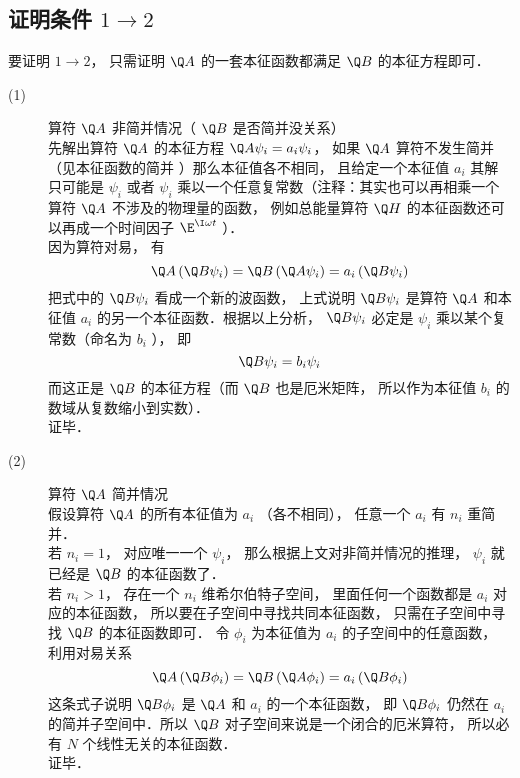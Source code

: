 \subsection{证明条件 $1 \to 2$}
要证明 $1 \to 2$，  只需证明 $\Q A$ 的一套本征函数都满足 $\Q B$ 的本征方程即可．
\begin{description}
  \item[(1)] 算符 $\Q A$ 非简并情况（ $\Q B$ 是否简并没关系）\\
  先解出算符 $\Q A$ 的本征方程 $\Q A{\psi _i} = {a_i}{\psi _i}$，  如果 $\Q A$ 算符不发生简并（见本征函数的简并%
  ）那么本征值各不相同， 且给定一个本征值 $a_i$ 其解只可能是 ${\psi _i}$ 或者 ${\psi _i}$ 乘以一个任意复常数（注释：其实也可以再相乘一个算符 $\Q A$ 不涉及的物理量的函数， 例如总能量算符 $\Q H$ 的本征函数还可以再成一个时间因子 ${\E^{\I\omega t}}$ ）．\\
  因为算符对易， 有
  \begin{equation}
    \Q A\left( {\Q B{\psi _i}} \right) = \Q B\left( {\Q A{\psi _i}} \right) = {a_i}\left( {\Q B{\psi _i}} \right)
  \end{equation}
  把式中的 $\Q B{\psi _i}$ 看成一个新的波函数， 上式说明 $\Q B{\psi _i}$ 是算符 $\Q A$ 和本征值 $a_i$ 的另一个本征函数．根据以上分析，  $\Q B{\psi _i}$ 必定是 ${\psi _i}$ 乘以某个复常数（命名为 $b_i$ ）， 即
  \begin{equation}
    \Q B{\psi _i} = {b_i}{\psi _i}
  \end{equation}
  而这正是 $\Q B$ 的本征方程（而 $\Q B$ 也是厄米矩阵， 所以作为本征值 $b_i$ 的数域从复数缩小到实数）．\\
  证毕．
  \item[(2)] 算符 $\Q A$ 简并情况\\
  假设算符 $\Q A$ 的所有本征值为 $a_i$ （各不相同）， 任意一个 $a_i$ 有 $n_i$ 重简并．\\
若 ${n_i} = 1$，  对应唯一一个 ${\psi _i}$，  那么根据上文对非简并情况的推理， ${\psi _i}$ 就已经是 $\Q B$ 的本征函数了．\\
若 ${n_i} > 1$，  存在一个 $n_i$ 维希尔伯特子空间， 里面任何一个函数都是 $a_i$ 对应的本征函数， 所以要在子空间中寻找共同本征函数， 只需在子空间中寻找 $\Q B$ 的本征函数即可． 令 ${\phi _i}$ 为本征值为 $a_i$ 的子空间中的任意函数， 利用对易关系
\begin{equation}
  \Q A\left( {\Q B{\phi _i}} \right) = \Q B\left( {\Q A{\phi _i}} \right) = {a_i}\left( {\Q B{\phi _i}} \right)
\end{equation}
这条式子说明 $\Q B{\phi _i}$ 是 $\Q A$ 和 $a_i$ 的一个本征函数， 即 $\Q B{\phi _i}$ 仍然在 $a_i$ 的简并子空间中．所以 $\Q B$ 对子空间来说是一个闭合的厄米算符， 所以必有 $N$ 个线性无关的本征函数．\\%
证毕．
\end{description}
